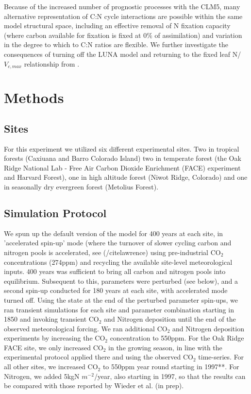 \documentclass[draft,linenumbers]{agujournal}
\begin{document}
Because of the increased number of prognostic processes with the CLM5, many alternative representation of C:N cycle interactions are possible within the same model structural space, including an effective removal of N fixation capacity (where carbon available for fixation is fixed at 0$\%$ of assimilation) and variation in the degree to which to C:N ratios are flexible. We further investigate the consequences of turning off the LUNA model and returning to the fixed leaf N/$V_{c,max}$ relationship from \cite{ghimire2016}.

\section{Methods}


\subsection{Sites}

For this experiment we utilized six different experimental sites. Two in tropical forests (Caxiuana and Barro Colorado Island) two in temperate forest (the Oak Ridge National Lab - Free Air Carbon Dioxide Enrichment (FACE) experiment and Harvard Forest), one in high altitude forest (Niwot Ridge, Colorado) and one in seasonally dry evergreen forest (Metolius Forest).


\subsection{Simulation Protocol}

We spun up the default version of the model for 400 years at each site, in 'accelerated spin-up' mode (where the turnover of slower cycling carbon and nitrogen pools is accelerated, see (/cite{lawrence}) using pre-industrial CO$_{2}$ concentrations (274ppm) and recycling the available site-level meteorological inputs. 400 years was sufficient to bring all carbon and nitrogen pools into equilibrium. Subsequent to this, parameters were perturbed (see below), and a second spin-up conducted for 180 years at each site, with accelerated mode turned off. Using the state at the end of the perturbed parameter spin-ups, we ran transient simulations for each site and parameter combination starting in 1850 and invoking transient CO$_{2}$ and Nitrogen deposition until the end of the observed meteorological forcing. We ran additional CO$_{2}$ and Nitrogen deposition experiments by increasing the CO$_{2}$ concentration to 550ppm. For the Oak Ridge FACE site, we only increased CO$_{2}$ in the growing season, in line with the experimental protocol applied there and using the observed CO$_{2}$ time-series. For all other sites, we increased CO$_{2}$ to 550ppm year round starting in 1997**. For Nitrogen, we added 5kgN $m^{-2}$/year, also starting in 1997, so that the results can be compared with those reported by Wieder et al. (in prep).
\end{document}
